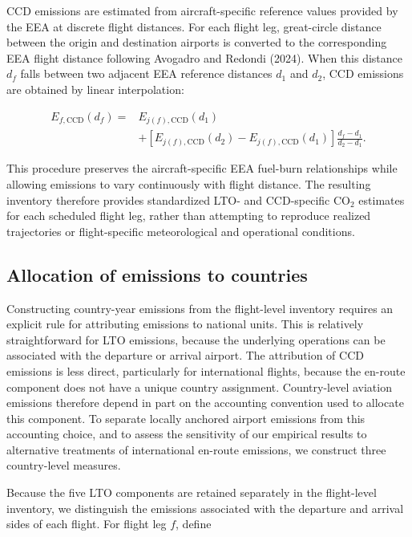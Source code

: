 \documentclass[12pt]{extarticle}
\begin{document}
CCD emissions are estimated from aircraft-specific reference values provided by the EEA at discrete flight distances. For each flight leg, great-circle distance between the origin and destination airports is converted to the corresponding EEA flight distance following Avogadro and Redondi (2024). When this distance $d_f$ falls between two adjacent EEA reference distances $d_1$ and $d_2$, CCD emissions are obtained by linear interpolation:

\begin{equation}
\begin{split}
E_{f,\mathrm{CCD}}(d_f)
={}&
E_{j(f),\mathrm{CCD}}(d_1)\\
&+
\left[
E_{j(f),\mathrm{CCD}}(d_2)
-
E_{j(f),\mathrm{CCD}}(d_1)
\right]
\frac{d_f-d_1}{d_2-d_1}.
\end{split}
\label{eq:nature_3}
\end{equation}

This procedure preserves the aircraft-specific EEA fuel-burn relationships while allowing emissions to vary continuously with flight distance. The resulting inventory therefore provides standardized LTO- and CCD-specific CO$_2$ estimates for each scheduled flight leg, rather than attempting to reproduce realized trajectories or flight-specific meteorological and operational conditions.

\subsection*{Allocation of emissions to countries}

Constructing country-year emissions from the flight-level inventory requires an explicit rule for attributing emissions to national units. This is relatively straightforward for LTO emissions, because the underlying operations can be associated with the departure or arrival airport. The attribution of CCD emissions is less direct, particularly for international flights, because the en-route component does not have a unique country assignment. Country-level aviation emissions therefore depend in part on the accounting convention used to allocate this component. To separate locally anchored airport emissions from this accounting choice, and to assess the sensitivity of our empirical results to alternative treatments of international en-route emissions, we construct three country-level measures.

Because the five LTO components are retained separately in the flight-level inventory, we distinguish the emissions associated with the departure and arrival sides of each flight. For flight leg $f$, define
\end{document}
